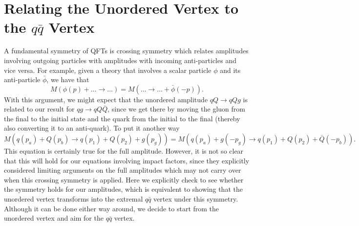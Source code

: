 \chapter{Relating the Unordered Vertex to the $q\bar{q}$ Vertex}
\label{app:crossing}

A fundamental symmetry of QFTs is crossing symmetry which relates amplitudes involving outgoing particles with amplitudes with incoming anti-particles and vice versa. For example, given a theory that involves a scalar particle $\phi$ and its anti-particle $\bar{\phi}$, we have that 
\begin{equation}
M(\phi(p) + \ldots \to \ldots) = M(\ldots \to \ldots + \bar{\phi}(-p)).
\end{equation}
With this argument, we might expect that the unordered amplitude $qQ \to qQg$ is related to our result for $qg \to qQ\bar{Q}$, since we get there by moving the gluon from the final to the initial state and the quark from the initial to the final (thereby also converting it to an anti-quark). To put it another way
\begin{equation}
M(q(p_a) + Q(p_b) \to q(p_1) + Q(p_2) + g(p_g)) = M(q(p_a) + g(-p_g) \to q(p_1) + Q(p_2) + \bar{Q}(-p_b)).
\end{equation}
This equation is certainly true for the full amplitude. However, it is not so clear that this will hold for our equations involving impact factors, since they explicitly considered limiting arguments on the full amplitudes which may not carry over when this crossing symmetry is applied. Here we explicitly check to see whether the symmetry holds for our amplitudes, which is equivalent to showing that the unordered vertex transforms into the extremal $q\bar{q}$ vertex under this symmetry. Although it can be done either way around, we decide to start from the unordered vertex and aim for the $q\bar{q}$ vertex. 

